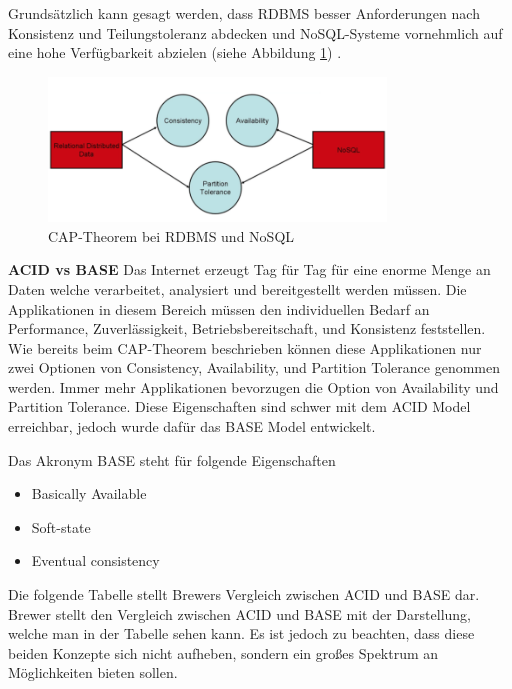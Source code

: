 Grundsätzlich kann gesagt werden, dass RDBMS besser Anforderungen nach Konsistenz und Teilungstoleranz abdecken und NoSQL-Systeme vornehmlich auf eine hohe Verfügbarkeit abzielen (siehe Abbildung \ref{fig:captheor}) \cite{MELD.CH2-noSQL.capTheoremComp}.

\begin{figure}[!htb]\centering
	\includegraphics[width=0.8\textwidth]{images/capTheorem}
	\caption{CAP-Theorem bei RDBMS und NoSQL\cite{MELD.CH2-noSQL.capTheoremComp}}
	\label{fig:captheor}
\end{figure}

\clearpage

\textbf{ACID vs BASE\newline}
Das Internet erzeugt Tag für Tag für eine enorme Menge an Daten welche verarbeitet, analysiert und bereitgestellt werden müssen. Die Applikationen in diesem Bereich müssen den individuellen Bedarf an Performance, Zuverlässigkeit, Betriebsbereitschaft, und Konsistenz feststellen. Wie bereits beim CAP-Theorem beschrieben können diese Applikationen nur zwei Optionen von Consistency, Availability, und Partition Tolerance genommen werden. Immer mehr Applikationen bevorzugen die Option von Availability und Partition Tolerance. Diese Eigenschaften sind schwer mit dem ACID Model erreichbar, jedoch wurde dafür das BASE Model entwickelt.

Das Akronym BASE steht für folgende Eigenschaften
\begin{itemize}
	\item Basically Available
	\item Soft-state
	\item Eventual consistency
\end{itemize}

Die folgende Tabelle stellt Brewers Vergleich zwischen ACID und BASE dar. 
Brewer stellt den Vergleich zwischen ACID und BASE mit der Darstellung, welche man in der Tabelle sehen kann. Es ist jedoch zu beachten, dass diese beiden Konzepte sich nicht aufheben, sondern ein großes Spektrum an Möglichkeiten bieten sollen. 

